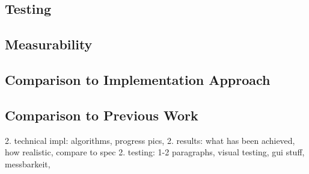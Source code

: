 \subsection{Testing}
\label{section:techimpl:testing}

\subsection{Measurability}
\label{section:techimpl:measure}

\subsection{Comparison to Implementation Approach}
\label{section:techimpl:comparison_impl}

\subsection{Comparison to Previous Work}
\label{section:techimpl:comparison}

2. technical impl: algorithms, progress pics, 
2. results: what has been achieved, how realistic, compare to spec
2. testing: 1-2 paragraphs, visual testing, gui stuff, messbarkeit,
